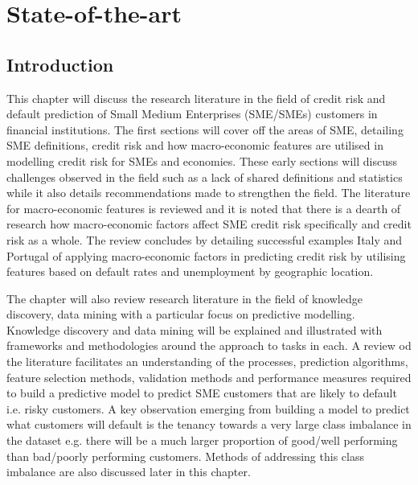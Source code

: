 
\chapter{State-of-the-art} %

\label{Chapter2} %


\section{Introduction}

This chapter will discuss the research literature in the field of credit risk and default prediction of Small Medium Enterprises (SME/SMEs) customers in financial institutions. The first sections will cover off the areas of SME, detailing SME definitions, credit risk and how macro-economic features are utilised in modelling credit risk for SMEs and economies. These early sections will discuss challenges observed in the field such as a lack of shared definitions and statistics while it also details recommendations made to strengthen the field. The literature for macro-economic features is reviewed and it is noted that there is a dearth of research how macro-economic factors affect SME credit risk specifically and credit risk as a whole. The review concludes by detailing successful examples Italy and Portugal of applying macro-economic factors in predicting credit risk by utilising features based on default rates and unemployment by geographic location. 

The chapter will also review research literature in the field of knowledge discovery, data mining with a particular focus on predictive modelling. Knowledge discovery and data mining will be explained and illustrated with frameworks and methodologies around the approach to tasks in each. A review od the literature facilitates an understanding of the processes, prediction algorithms, feature selection methods, validation methods and performance measures required to build a predictive model to predict SME customers that are likely to default i.e. risky customers. A key observation emerging from  building a model to predict what customers will default is the tenancy towards a very large class imbalance in the dataset e.g. there will be a much larger proportion of good/well performing than bad/poorly performing customers. Methods of addressing this class imbalance are also discussed later in this chapter.

